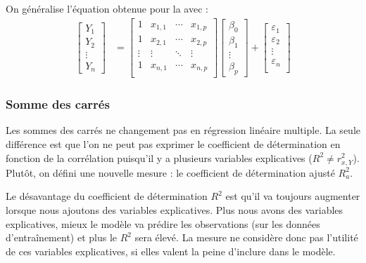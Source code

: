 \documentclass[french]{article}
\begin{document}
\begin{multicols*}{2}
On généralise l'équation obtenue pour la \textit{\underline{}}  avec : 
\begin{align*}
	\begin{bmatrix}
		Y_{1}	\\
		Y_{2}	\\
		\vdots	\\
		Y_{n}
	\end{bmatrix}
	&=	
	\begin{bmatrix}
		1	&	x_{1, 1}	&	\cdots	&	x_{1, p}	\\
		1	&	x_{2, 1}	&	\cdots	&	x_{2, p}	\\
	\vdots	&	\vdots	&	\ddots	&	\vdots	\\
		1	&	x_{n, 1}	&	\cdots	&	x_{n, p}	\\
	\end{bmatrix}
	\begin{bmatrix}
		\beta_{0}	\\
		\beta_{1}	\\
		\vdots		\\
		\beta_{p}
	\end{bmatrix} + 
	\begin{bmatrix}
		\varepsilon_{1}	\\
		\varepsilon_{2}	\\
		\vdots	\\
		\varepsilon_{n}	\\
	\end{bmatrix}
\end{align*}



\subsubsection{Somme des carrés}
\begin{rappel_enhanced}[Contexte]
Les sommes des carrés ne changement pas en régression linéaire multiple. La seule différence est que l'on ne peut pas exprimer le coefficient de détermination en fonction de la corrélation puisqu'il y a plusieurs variables explicatives ($R^{2} \neq r_{x, Y}^{2}$). Plutôt, on défini une nouvelle mesure : le coefficient de détermination ajusté $R_{a}^{2}$.
\end{rappel_enhanced}


\begin{definitionNOHFILL}
\begin{rappel_enhanced}[Contexte]
Le désavantage du coefficient de détermination $R^{2}$ est qu'il va toujours augmenter lorsque nous ajoutons des variables explicatives. Plus nous avons des variables explicatives, mieux le modèle va prédire les observations (sur les données d'entraînement) et plus le $R^{2}$ sera élevé. La mesure ne considère donc pas l'utilité de ces variables explicatives, si elles valent la peine d'inclure dans le modèle.


\end{rappel_enhanced}
\end{definitionNOHFILL}
\end{multicols*}
\end{document}
